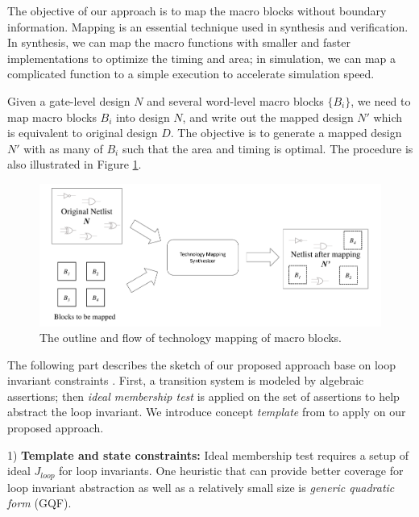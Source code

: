 The objective of our approach is to map the macro blocks without boundary information.
Mapping is an essential technique used in synthesis and verification. In synthesis, we can map the 
macro functions with smaller and faster implementations to optimize the timing and area; in simulation,
we can map a complicated function to a simple execution to accelerate simulation speed.

\begin{Problem}
Given a gate-level design $N$ and several word-level macro blocks $\{B_i\}$, we need to map macro
blocks $B_i$ into design $N$, and write out the mapped design $N'$ which is equivalent to original
design $D$. The objective is to generate a mapped design $N'$ with as many of $B_i$ such that the area
and timing is optimal. The procedure is also illustrated in Figure \ref{fig:macro}.

\begin{figure}[h]
	\begin{center}
	\includegraphics[width=\textwidth]{newfig/macro.pdf}
	\end{center}
	\caption{The outline and flow of technology mapping of macro blocks.}
	\label{fig:macro}
\end{figure}

\end{Problem}

The following part describes the sketch of our proposed approach base on loop invariant constraints \cite{sankaranarayanan2004non}.
First, a transition system is modeled by algebraic assertions; then \emph{ideal membership test} \cite{lv:phd}
is applied on the set of assertions to help abstract the loop invariant. We introduce concept \emph{template}
from \cite{sankaranarayanan2004non} to apply on our proposed approach.

1) {\bf Template and state constraints:}  Ideal membership test requires a setup of ideal $J_{loop}$
for loop invariants. 
One heuristic that can provide better coverage for loop invariant abstraction as well as a
relatively small size is \emph{generic quadratic form} (GQF).

